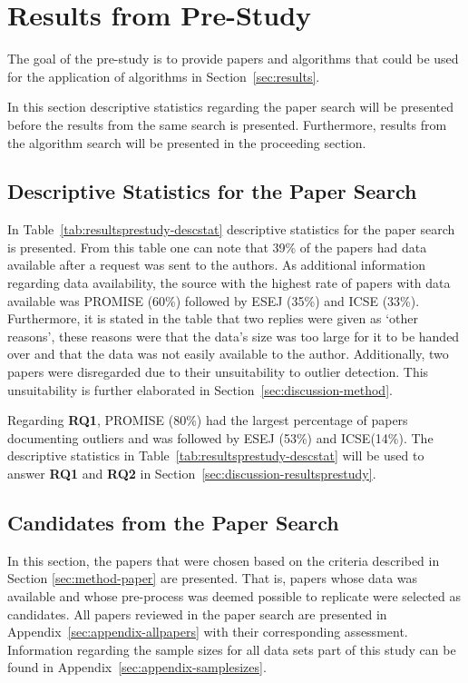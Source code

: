 ﻿\section{Results from Pre-Study}
\label{sec:resultsprestudy}
The goal of the pre-study is to provide papers and algorithms that could be used for the application of algorithms in Section~\ref{sec:results}.




In this section descriptive statistics regarding the paper search will be presented before the results from the same search is presented. Furthermore, results from the algorithm search will be presented in the proceeding section.




\subsection{Descriptive Statistics for the Paper Search}
\label{sec:resultsprestudy-descriptive}
In Table~\ref{tab:resultsprestudy-descstat} descriptive statistics for the paper search is presented. From this table one can note that 39\% of the papers had data available after a request was sent to the authors. As additional information regarding data availability, the source with the highest rate of papers with data available was PROMISE (60\%) followed by ESEJ (35\%) and ICSE (33\%).  Furthermore, it is stated in the table that two replies were given as `other reasons', these reasons were that the data's size was too large for it to be handed over and that the data was not easily available to the author. Additionally, two papers were disregarded due to their unsuitability to outlier detection. This unsuitability is further elaborated in Section~\ref{sec:discussion-method}. 




Regarding \textbf{RQ1}, PROMISE (80\%) had the largest percentage of papers documenting outliers and was followed by ESEJ (53\%) and ICSE(14\%). The descriptive statistics in Table~\ref{tab:resultsprestudy-descstat}  will be used to answer \textbf{RQ1} and \textbf{RQ2} in Section~\ref{sec:discussion-resultsprestudy}.







\subsection{Candidates from the Paper Search}
In this section, the papers that were chosen based on the criteria described in Section \ref{sec:method-paper} are presented. That is, papers whose data was available and whose pre-process was deemed possible to replicate were selected as candidates. All papers reviewed in the paper search are presented in Appendix~\ref{sec:appendix-allpapers} with their corresponding assessment. Information regarding the sample sizes for all data sets part of this study can be found in Appendix~\ref{sec:appendix-samplesizes}.


